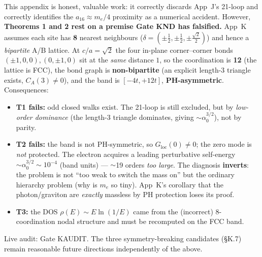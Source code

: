 \documentclass[aps,prl,preprint,superscriptaddress,floatfix]{revtex4-2}
\newcommand{\az}{\alpha_0}
\newcommand{\me}{m_e}
\newcommand{\Gloc}{G_{\mathrm{loc}}}
\begin{document}
\begin{tcolorbox}[colback=white,colframe=bctnavy,boxrule=1.2pt,arc=2pt,
  title=\textbf{COLD LEDGER AUDIT NOTICE --- COORDINATION 8 vs 12}]
\small
This appendix is honest, valuable work: it correctly discards App~J's 21-loop and correctly
identifies the $a_{16}\approx\me/4$ proximity as a numerical accident. However, \textbf{Theorems 1
and 2 rest on a premise Gate KND has falsified.} App~K assumes each site has \textbf{8} nearest
neighbours ($\delta=(\pm\tfrac12,\pm\tfrac12,\pm\tfrac{\sqrt2}{2})$) and hence a \emph{bipartite}
A/B lattice. At $c/a=\sqrt2$ the four in-plane corner--corner bonds $(\pm1,0,0),(0,\pm1,0)$ sit at
the \emph{same} distance $1$, so the coordination is \textbf{12} (the lattice is FCC), the bond
graph is \textbf{non-bipartite} (an explicit length-3 triangle exists, $C_A(3)\neq0$), and the band
is $[-4t,+12t]$, \textbf{PH-asymmetric}. Consequences:
\begin{itemize}\itemsep0pt
\item \textbf{T1 fails:} odd closed walks exist. The 21-loop is still excluded, but by
\emph{low-order dominance} (the length-3 triangle dominates, giving $\sim\az^{3/2}$), not by parity.
\item \textbf{T2 fails:} the band is not PH-symmetric, so $\Gloc(0)\neq0$; the zero mode is
\emph{not} protected. The electron acquires a leading perturbative self-energy $\sim\az^{3/2}\sim
10^{-4}$ (band units) --- $\sim$19 orders \emph{too large}. The diagnosis \textbf{inverts}: the
problem is not ``too weak to switch the mass on'' but the ordinary hierarchy problem (why is $\me$
so tiny). App~K's corollary that the photon/graviton are \emph{exactly} massless by PH protection
loses its proof.
\item \textbf{T3:} the DOS $\rho(E)\sim E\ln(1/E)$ came from the (incorrect) 8-coordination nodal
structure and must be recomputed on the FCC band.
\end{itemize}
Live audit: Gate KAUDIT. The three symmetry-breaking candidates (\S K.7) remain reasonable future
directions independently of the above.
\end{tcolorbox}
\end{document}
